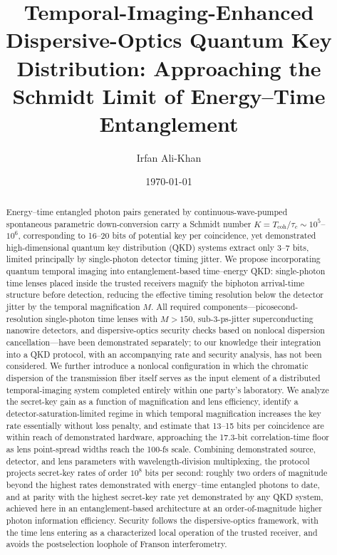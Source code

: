 \documentclass[11pt]{article}
\title{\textbf{Temporal-Imaging-Enhanced Dispersive-Optics Quantum Key Distribution: Approaching the Schmidt Limit of Energy--Time Entanglement}}
\author[1]{Irfan Ali-Khan}
\affil[1]{Independent Researcher, Saratoga, California, USA}
\date{\today}
\begin{document}
\maketitle
\thispagestyle{fancy}

\begin{abstract}
Energy--time entangled photon pairs generated by continuous-wave-pumped spontaneous parametric down-conversion carry a Schmidt number $K = T_{\mathrm{coh}}/\tau_c \sim 10^5$--$10^6$, corresponding to 16--20 bits of potential key per coincidence, yet demonstrated high-dimensional quantum key distribution (QKD) systems extract only 3--7 bits, limited principally by single-photon detector timing jitter. We propose incorporating quantum temporal imaging into entanglement-based time--energy QKD: single-photon time lenses placed inside the trusted receivers magnify the biphoton arrival-time structure before detection, reducing the effective timing resolution below the detector jitter by the temporal magnification $M$. All required components---picosecond-resolution single-photon time lenses with $M>150$, sub-3-ps-jitter superconducting nanowire detectors, and dispersive-optics security checks based on nonlocal dispersion cancellation---have been demonstrated separately; to our knowledge their integration into a QKD protocol, with an accompanying rate and security analysis, has not been considered. We further introduce a nonlocal configuration in which the chromatic dispersion of the transmission fiber itself serves as the input element of a distributed temporal-imaging system completed entirely within one party's laboratory. We analyze the secret-key gain as a function of magnification and lens efficiency, identify a detector-saturation-limited regime in which temporal magnification increases the key rate essentially without loss penalty, and estimate that 13--15 bits per coincidence are within reach of demonstrated hardware, approaching the 17.3-bit correlation-time floor as lens point-spread widths reach the 100-fs scale. Combining demonstrated source, detector, and lens parameters with wavelength-division multiplexing, the protocol projects secret-key rates of order $10^8$ bits per second: roughly two orders of magnitude beyond the highest rates demonstrated with energy--time entangled photons to date, and at parity with the highest secret-key rate yet demonstrated by any QKD system, achieved here in an entanglement-based architecture at an order-of-magnitude higher photon information efficiency. Security follows the dispersive-optics framework, with the time lens entering as a characterized local operation of the trusted receiver, and avoids the postselection loophole of Franson interferometry.
\end{abstract}
\end{document}
